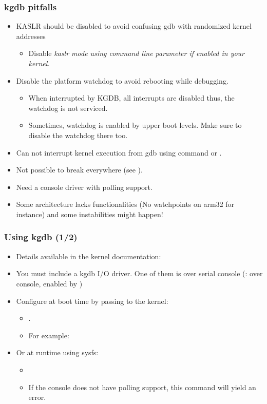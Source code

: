 {\begin{frame}
  \frametitle{kgdb pitfalls}
  \begin{itemize}
    \item KASLR should be disabled to avoid confusing gdb with randomized kernel
          addresses
    \begin{itemize}
      \item Disable \em{kaslr} mode using  command line parameter
            if enabled in your kernel.
    \end{itemize}
    \item Disable the platform watchdog to avoid rebooting while debugging.
    \begin{itemize}
      \item When interrupted by KGDB, all interrupts are disabled thus, the
            watchdog is not serviced.
      \item Sometimes, watchdog is enabled by upper boot levels. Make sure to
            disable the watchdog there too.
    \end{itemize}
    \item Can not interrupt kernel execution from gdb using 
          command or .
    \item Not possible to break everywhere (see ).
    \item Need a console driver with polling support.
    \item Some architecture lacks functionalities (No watchpoints on arm32 for
          instance) and some instabilities might happen!
  \end{itemize}
\end{frame}
}{}

\begin{frame}
  \frametitle{Using kgdb (1/2)}
  \begin{itemize}
  \item Details available in the kernel documentation:
  \item You must include a kgdb I/O driver. One of them is  over
    serial console (:  over console, enabled by
    )
  \item Configure  at boot time by passing to the kernel:
    \begin{itemize}
    \item {}.
    \item For example: 
    \end{itemize}
  \item Or at runtime using sysfs:
   \begin{itemize}
   \item {}
   \item If the console does not have polling support, this command will yield
         an error.
   \end{itemize}
  \end{itemize}
\end{frame}

